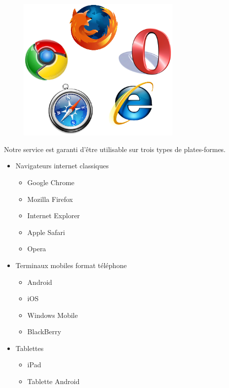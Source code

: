 \documentclass{life-fr}
\begin{document}
\begin{figure}[H]
  \begin{center}
    \includegraphics[width=8cm]{img/navigateurs.png}
  \end{center}
\end{figure}

Notre service est garanti d'être utilisable sur trois types de plates-formes.

\begin{itemize}
  \item Navigateurs internet classiques
    \begin{itemize}
      \item Google Chrome
      \item Mozilla Firefox
      \item Internet Explorer
      \item Apple Safari
      \item Opera
    \end{itemize}
  \item Terminaux mobiles format téléphone
    \begin{itemize}
      \item Android
      \item iOS
      \item Windows Mobile
      \item BlackBerry
    \end{itemize}
  \item Tablettes
    \begin{itemize}
      \item iPad
      \item Tablette Android
    \end{itemize}
\end{itemize}
\end{document}
